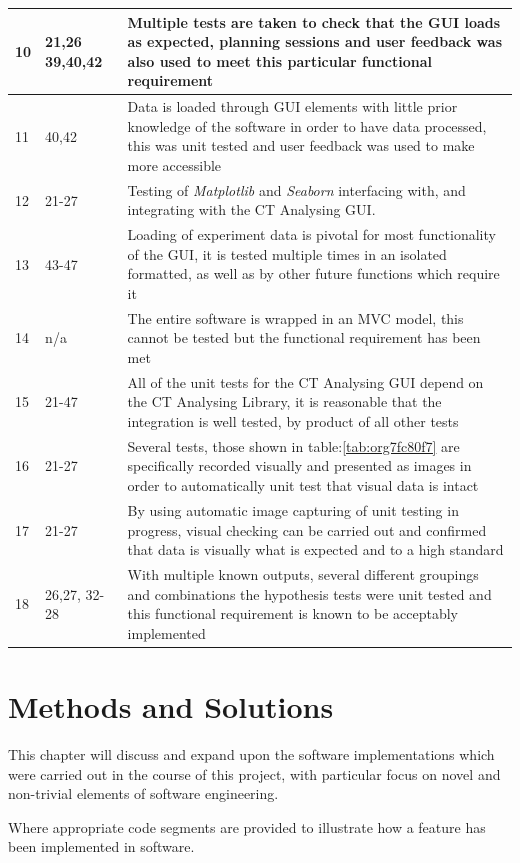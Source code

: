 \documentclass[11pt]{report}
\begin{document}
\begin{longtable}{|l|l|p{14cm}|}
\hline
10 & 21,26 39,40,42 & Multiple tests are taken to check that the GUI loads as expected, planning sessions and user feedback was also used to meet this particular functional requirement\\
\hline
11 & 40,42 & Data is loaded through GUI elements with little prior knowledge of the software in order to have data processed, this was unit tested and user feedback was used to make more accessible\\
\hline
12 & 21-27 & Testing of \emph{Matplotlib} and \emph{Seaborn} interfacing with, and integrating with the CT Analysing GUI.\\
\hline
13 & 43-47 & Loading of experiment data is pivotal for most functionality of the GUI, it is tested multiple times in an isolated formatted, as well as by other future functions which require it\\
\hline
14 & n/a & The entire software is wrapped in an MVC model, this cannot be tested but the functional requirement has been met\\
\hline
15 & 21-47 & All of the unit tests for the CT Analysing GUI depend on the CT Analysing Library, it is reasonable that the integration is well tested, by product of all other tests\\
\hline
16 & 21-27 & Several tests, those shown in table:\ref{tab:org7fc80f7} are specifically recorded visually and presented as images in order to automatically unit test that visual data is intact\\
\hline
17 & 21-27 & By using automatic image capturing of unit testing in progress, visual checking can be carried out and confirmed that data is visually what is expected and to a high standard\\
\hline
18 & 26,27, 32-28 & With multiple known outputs, several different groupings and combinations the hypothesis tests were unit tested and this functional requirement is known to be acceptably implemented\\
\hline
\end{longtable}

\chapter{Methods and Solutions}
\label{sec:org5704188}
This chapter will discuss and expand upon the software implementations which were carried out in the course of this project, with particular focus on novel and non-trivial elements of software engineering.

Where appropriate code segments are provided to illustrate how a feature has been implemented in software.
\end{document}
